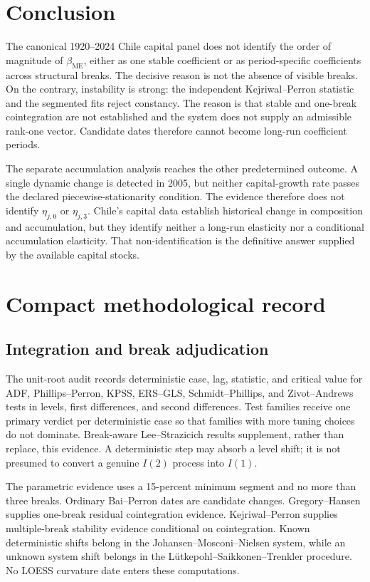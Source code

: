 \documentclass[11pt,a4paper]{article}
\begin{document}
\FloatBarrier
\section{Conclusion}

The canonical 1920--2024 Chile capital panel does not identify the order of
magnitude of \(\beta_{\mathrm{ME}}\), either as one stable coefficient or as
period-specific coefficients across structural breaks. The decisive reason
is not the absence of visible breaks. On the contrary, instability is strong:
the independent Kejriwal--Perron statistic and the segmented fits reject
constancy. The reason is that stable and one-break cointegration are not
established and the system does not supply an admissible rank-one vector.
Candidate dates therefore cannot become long-run coefficient periods.

The separate accumulation analysis reaches the other predetermined outcome.
A single dynamic change is detected in 2005, but neither capital-growth rate
passes the declared piecewise-stationarity condition. The evidence therefore
does not identify \(\eta_{j,0}\) or \(\eta_{j,3}\). Chile's capital data
establish historical change in composition and accumulation, but they
identify neither a long-run elasticity nor a conditional accumulation
elasticity. That non-identification is the definitive answer supplied by the
available capital stocks.

\FloatBarrier
\appendix
\section{Compact methodological record}

\subsection{Integration and break adjudication}

The unit-root audit records deterministic case, lag, statistic, and critical
value for ADF, Phillips--Perron, KPSS, ERS--GLS,
Schmidt--Phillips, and Zivot--Andrews tests in levels, first differences, and
second differences. Test families receive one primary verdict per
deterministic case so that families with more tuning choices do not dominate.
Break-aware Lee--Strazicich results supplement, rather than replace, this
evidence. A deterministic step may absorb a level shift; it is not presumed
to convert a genuine \(I(2)\) process into \(I(1)\).

The parametric evidence uses a 15-percent minimum segment and no more than
three breaks. Ordinary Bai--Perron dates are candidate changes.
Gregory--Hansen supplies one-break residual cointegration evidence.
Kejriwal--Perron supplies multiple-break stability evidence conditional on
cointegration. Known deterministic shifts belong in the
Johansen--Mosconi--Nielsen system, while an unknown system shift belongs in
the L\"utkepohl--Saikkonen--Trenkler procedure. No LOESS curvature date enters
these computations.
\end{document}
